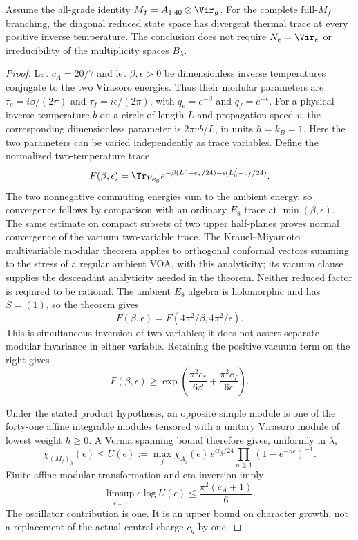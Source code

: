 \begin{proposition}\label{prop:c-diagonal-divergence}
Assume the all-grade identity $M_f=A_{1,40}\otimes\Vir_g$.
For the complete full-$M_f$ branching, the diagonal reduced state
space has divergent thermal trace at every positive inverse
temperature. The conclusion does not require $N_e=\Vir_e$ or
irreducibility of the multiplicity spaces $B_\lambda$.
\end{proposition}
\begin{proof}
Let $c_A=20/7$ and let $\beta,\epsilon>0$ be dimensionless inverse
temperatures conjugate to the two Virasoro energies. Thus their
modular parameters are $\tau_e=i\beta/(2\pi)$ and
$\tau_f=i\epsilon/(2\pi)$, with $q_e=e^{-\beta}$ and
$q_f=e^{-\epsilon}$. For a physical inverse temperature $b$ on a
circle of length $L$ and propagation speed $v$, the corresponding
dimensionless parameter is $2\pi vb/L$, in units $\hbar=k_B=1$.
Here the two parameters can be varied independently as trace variables.
Define the normalized two-temperature trace
\[
 F(\beta,\epsilon)=\Tr_{V_{E_8}}
 e^{-\beta(L^e_0-c_*/24)-\epsilon(L^f_0-c_f/24)}.
\]
The two nonnegative commuting energies sum to the ambient energy,
so convergence follows by comparison with an ordinary $E_8$ trace
at $\min(\beta,\epsilon)$. The same estimate on compact subsets
of two upper half-planes proves normal convergence of the
vacuum two-variable trace. The Krauel--Miyamoto multivariable
modular theorem applies to orthogonal conformal vectors summing
to the stress of a regular ambient VOA, with this analyticity;
its vacuum clause supplies the descendant analyticity needed in
the theorem. Neither reduced factor is required to be rational.
The ambient $E_8$ algebra is holomorphic and has $S=(1)$, so the
theorem gives
\[
 F(\beta,\epsilon)=F(4\pi^2/\beta,4\pi^2/\epsilon).
\]
This is simultaneous inversion of two variables; it does not assert
separate modular invariance in either variable. Retaining the positive
vacuum term on the right gives
\[
 F(\beta,\epsilon)\geq
 \exp\left(\frac{\pi^2c_*}{6\beta}
                        +\frac{\pi^2c_f}{6\epsilon}\right).
\]

Under the stated product hypothesis, an opposite simple module is
one of the forty-one affine integrable modules tensored with a
unitary Virasoro module of lowest weight $h\geq0$. A Verma spanning
bound therefore gives, uniformly in $\lambda$,
\[
 \chi_{(M_f)_\lambda}(\epsilon)\leq U(\epsilon):=
 \max_j\chi_{A_j}(\epsilon)\,
 e^{\epsilon c_g/24}\prod_{n\geq1}(1-e^{-n\epsilon})^{-1}.
\]
Finite affine modular transformation and eta inversion imply
\[
 \limsup_{\epsilon\downarrow0}\epsilon\log U(\epsilon)
                      \leq\frac{\pi^2(c_A+1)}6.
\]
The oscillator contribution is one. It is an upper bound on character
growth, not a replacement of the actual central charge $c_g$ by one.


\end{proof}
